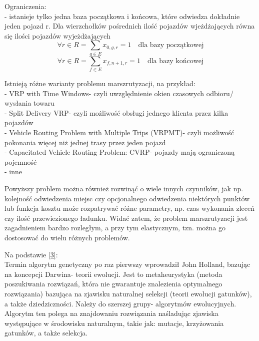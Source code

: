\documentclass[a4paper, twoside, 12pt, justified]{article}
\begin{document}
	\hspace{-6mm}Ograniczenia:\\
	- istanieje tylko jedna baza początkowa i końcowa, które odwiedza dokładnie jeden pojazd r. Dla wierzchołków pośrednich ilość pojazdów wjeżdżających równa się ilości pojazdów wyjeżdżających\\
	
	\begin{equation}
	{\forall r \in R=\sum\limits_{g \in E}}x_{0,g,r}=1 \quad \text{dla bazy początkowej}
	\end{equation}
	\begin{equation}
	{\forall r \in R=\sum\limits_{f \in E}}x_{f,n+1,r}=1 \quad \text{dla bazy końcowej}
	\end{equation}
	
	

	
	
	
	
	
	Istnieją różne warianty problemu marszrutyzacji, na przykład:\\ 
	- VRP with Time Windows- czyli uwzględnienie okien czasowych odbioru/ wysłania towaru\\
	- Split Delivery VRP- czyli możliwość obsługi jednego klienta przez kilka pojazdów\\
	- Vehicle Routing Problem with Multiple Trips (VRPMT)- czyli możliwość pokonania więcej niż jednej trasy przez jeden pojazd\\
	- Capacitated Vehicle Routing Problem: CVRP- pojazdy mają ograniczoną pojemność\\ 
	- inne

	\vspace{5mm} %

	Powyższy problem można również rozwinąć o wiele innych czynników, jak np. kolejność odwiedzenia miejsc czy opcjonalnego odwiedzenia niektórych punktów lub funkcja kosztu może rozpatrywać różne parametry, np. czas wykonania zleceń czy ilość przewiezionego ładunku. Widać zatem, że problem marszrutyzacji jest zagadnieniem bardzo rozległym, a przy tym elastycznym, tzn. można go dostosować do wielu różnych problemów.
	
	\vspace{5mm}
	
	Na podstawie \hyperlink{ag}{[3]}:\\
	Termin algorytm genetyczny po raz pierwszy wprowadził John Holland, bazując na koncepcji Darwina- teorii ewolucji. Jest to metaheurystyka (metoda poszukiwania rozwiązań, która nie gwarantuje znalezienia optymalnego rozwiązania) bazująca na zjawisku naturalnej selekcji (teorii ewolucji gatunków), a także dziedziczności. Należy do szerszej grupy- algorytmów ewolucyjnych. Algorytm ten polega na znajdowaniu rozwiązania naśladując zjawiska występujące w środowisku naturalnym, takie jak: mutacje, krzyżowania gatunków, a także selekcja. \newpage
	
\end{document}
